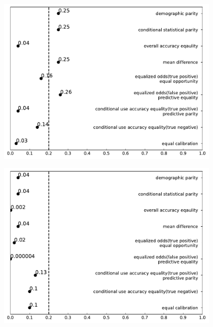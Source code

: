 \documentclass[conference]{IEEEtran}
\begin{document}
\begin{figure}[h]
    \centering
    \begin{minipage}[b]{0.48\linewidth}
        \centering
        \includegraphics[width=\linewidth]{Less than 25}
        \label{fig:1}
    \end{minipage}
    \hfill
    \begin{minipage}[b]{0.48\linewidth}
        \centering
        \includegraphics[width=\linewidth]{Male}
        \label{fig:2}
    \end{minipage}
    \hfill
    \begin{minipage}[b]{0.48\linewidth}
        \centering

\end{minipage}
\end{figure}
\end{document}
